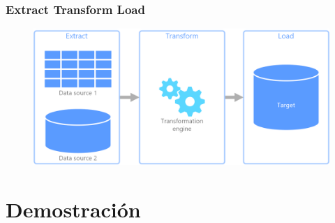\documentclass{beamer}
\begin{document}
\begin{frame}

\frametitle{Extract Transform Load}

  \begin{figure}
    \centering
    \includegraphics[width=\textwidth]{etl.png}
  \end{figure}

\end{frame}

\section{Demostración}
\end{document}
